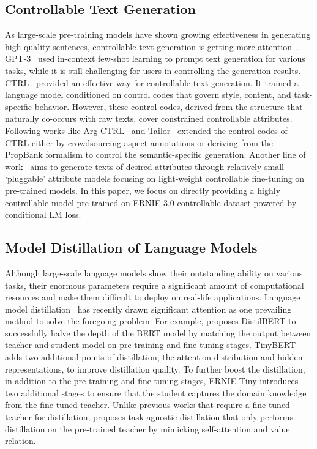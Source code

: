 \subsection{Controllable Text Generation} As large-scale pre-training models have shown growing effectiveness in generating high-quality sentences, controllable text generation is getting more attention~\cite{NitishShirishKeskar2019CTRLAC}. GPT-3~\cite{gpt-3} used in-context few-shot learning to prompt text generation for various tasks, while it is still challenging for users in controlling the generation results. CTRL~\cite{NitishShirishKeskar2019CTRLAC} provided an effective way for controllable text generation. It trained a language model conditioned on control codes that govern style, content, and task-specific behavior. However, these control codes, derived from the structure that naturally co-occurs with raw texts, cover constrained controllable attributes. Following works like Arg-CTRL~\cite{BenjaminSchiller2020AspectControlledNA} and Tailor~\cite{AlexisRoss2021TailorGA} extended the control codes of CTRL either by crowdsourcing aspect annotations or deriving from the PropBank formalism to control the semantic-specific generation. Another line of work~\cite{SumanthDathathri2019PlugAP, AlvinChan2020CoConAS} aims to generate texts of desired attributes through relatively small ‘pluggable’ attribute models focusing on light-weight controllable fine-tuning on pre-trained models. In this paper, we focus on directly providing a highly controllable model pre-trained on ERNIE 3.0 controllable dataset powered by conditional LM loss.

\subsection{Model Distillation of Language Models} Although large-scale language models show their outstanding ability on various tasks, their enormous parameters require a significant amount of computational resources and make them difficult to deploy on real-life applications. Language model distillation~\cite{tinybert,ernie-tiny,minilm,minilmv2,pkd,mobilebert,well-read,distill-bert,sixteen} has recently drawn significant attention as one prevailing method to solve the foregoing problem. For example, \cite{distill-bert} proposes DistilBERT to successfully halve the depth of the BERT model by matching the output between teacher and student model on pre-training and fine-tuning stages. TinyBERT \cite{tinybert} adds two additional points of distillation, the attention distribution and hidden representations, to improve distillation quality. To further boost the distillation, in addition to the pre-training and fine-tuning stages, ERNIE-Tiny \cite{ernie-tiny} introduces two additional stages to ensure that the student captures the domain knowledge from the fine-tuned teacher. Unlike previous works that require a fine-tuned teacher for distillation, \cite{minilm} proposes task-agnostic distillation that only performs distillation on the pre-trained teacher by mimicking self-attention and value relation. 

